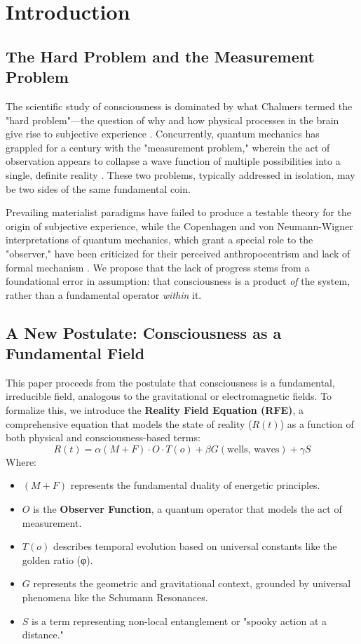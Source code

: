 \documentclass[twocolumn]{svjour3}
\begin{document}
\section{Introduction}
\label{intro}

\subsection{The Hard Problem and the Measurement Problem}
\label{sec:1.1}
The scientific study of consciousness is dominated by what Chalmers termed the "hard problem"—the question of why and how physical processes in the brain give rise to subjective experience \cite{Chalmers1995}. Concurrently, quantum mechanics has grappled for a century with the "measurement problem," wherein the act of observation appears to collapse a wave function of multiple possibilities into a single, definite reality \cite{Wigner1961}. These two problems, typically addressed in isolation, may be two sides of the same fundamental coin.

Prevailing materialist paradigms have failed to produce a testable theory for the origin of subjective experience, while the Copenhagen and von Neumann-Wigner interpretations of quantum mechanics, which grant a special role to the "observer," have been criticized for their perceived anthropocentrism and lack of formal mechanism \cite{Stapp2007}. We propose that the lack of progress stems from a foundational error in assumption: that consciousness is a product \textit{of} the system, rather than a fundamental operator \textit{within} it.

\subsection{A New Postulate: Consciousness as a Fundamental Field}
\label{sec:1.2}
This paper proceeds from the postulate that consciousness is a fundamental, irreducible field, analogous to the gravitational or electromagnetic fields. To formalize this, we introduce the \textbf{Reality Field Equation (RFE)}, a comprehensive equation that models the state of reality ($R(t)$) as a function of both physical and consciousness-based terms:
\begin{equation}
R(t) = \alpha(M+F) \cdot O \cdot T(o) + \beta G(\text{wells, waves}) + \gamma S
\label{eq:rfe}
\end{equation}
Where:
\begin{itemize}
    \item[$\bullet$] $(M+F)$ represents the fundamental duality of energetic principles.
    \item[$\bullet$] $O$ is the \textbf{Observer Function}, a quantum operator that models the act of measurement.
    \item[$\bullet$] $T(o)$ describes temporal evolution based on universal constants like the golden ratio (φ).
    \item[$\bullet$] $G$ represents the geometric and gravitational context, grounded by universal phenomena like the Schumann Resonances.
    \item[$\bullet$] $S$ is a term representing non-local entanglement or "spooky action at a distance."
\end{itemize}
\end{document}
